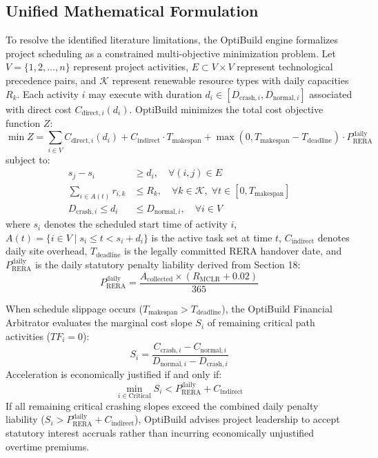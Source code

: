 \documentclass[conference]{IEEEtran}
\begin{document}
\subsection{Unified Mathematical Formulation}
To resolve the identified literature limitations, the OptiBuild engine formalizes project scheduling as a constrained multi-objective minimization problem. Let $V = \{1, 2, \dots, n\}$ represent project activities, $E \subset V \times V$ represent technological precedence pairs, and $\mathcal{K}$ represent renewable resource types with daily capacities $R_k$. Each activity $i$ may execute with duration $d_i \in [D_{\text{crash}, i}, D_{\text{normal}, i}]$ associated with direct cost $C_{\text{direct}, i}(d_i)$. OptiBuild minimizes the total cost objective function $Z$:
\begin{equation}
\min Z = \sum_{i \in V} C_{\text{direct}, i}(d_i) + C_{\text{indirect}} \cdot T_{\text{makespan}} + \max(0, T_{\text{makespan}} - T_{\text{deadline}}) \cdot P_{\text{RERA}}^{\text{daily}}
\end{equation}
subject to:
\begin{align}
s_j - s_i &\ge d_i, \quad \forall (i, j) \in E \\
\sum_{i \in A(t)} r_{i, k} &\le R_k, \quad \forall k \in \mathcal{K}, \; \forall t \in [0, T_{\text{makespan}}] \\
D_{\text{crash}, i} \le d_i &\le D_{\text{normal}, i}, \quad \forall i \in V
\end{align}
where $s_i$ denotes the scheduled start time of activity $i$, $A(t) = \{i \in V \mid s_i \le t < s_i + d_i\}$ is the active task set at time $t$, $C_{\text{indirect}}$ denotes daily site overhead, $T_{\text{deadline}}$ is the legally committed RERA handover date, and $P_{\text{RERA}}^{\text{daily}}$ is the daily statutory penalty liability derived from Section 18:
\begin{equation}
P_{\text{RERA}}^{\text{daily}} = \frac{A_{\text{collected}} \times (R_{\text{MCLR}} + 0.02)}{365}
\end{equation}

When schedule slippage occurs ($T_{\text{makespan}} > T_{\text{deadline}}$), the OptiBuild Financial Arbitrator evaluates the marginal cost slope $S_i$ of remaining critical path activities ($TF_i = 0$):
\begin{equation}
S_i = \frac{C_{\text{crash}, i} - C_{\text{normal}, i}}{D_{\text{normal}, i} - D_{\text{crash}, i}}
\end{equation}
Acceleration is economically justified if and only if:
\begin{equation}
\min_{i \in \text{Critical}} S_i < P_{\text{RERA}}^{\text{daily}} + C_{\text{indirect}}
\end{equation}
If all remaining critical crashing slopes exceed the combined daily penalty liability ($S_i > P_{\text{RERA}}^{\text{daily}} + C_{\text{indirect}}$), OptiBuild advises project leadership to accept statutory interest accruals rather than incurring economically unjustified overtime premiums.
\end{document}
